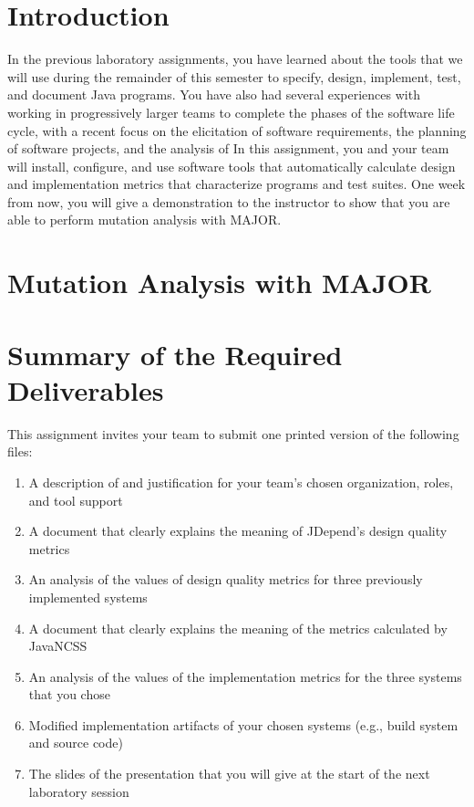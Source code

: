

\usepackage[compact]{titlesec}



\section*{Introduction}

In the previous laboratory assignments, you have learned about the tools that we will use during the remainder of this
semester to specify, design, implement, test, and document Java programs.  You have also had several experiences with
working in progressively larger teams to complete the phases of the software life cycle, with a recent focus on the
elicitation of software requirements, the planning of software projects, and the analysis of   In this assignment, you
and your team will install, configure, and use software tools that automatically calculate design and implementation
metrics that characterize programs and test suites. One week from now, you will give a demonstration to the instructor
to show that you are able to perform mutation analysis with MAJOR.

\section*{Mutation Analysis with MAJOR}

\section*{Summary of the Required Deliverables}

This assignment invites your team to submit one printed version of the following files:
\vspace*{-.1in}
\begin{enumerate}
	\itemsep0em 
	\item A description of and justification for your team's chosen organization, roles, and tool support
	\item A document that clearly explains the meaning of JDepend's design quality metrics 
	\item An analysis of the values of design quality metrics for three previously implemented systems 
	\item A document that clearly explains the meaning of the metrics calculated by JavaNCSS
	\item An analysis of the values of the implementation metrics for the three systems that you chose
	\item Modified implementation artifacts of your chosen systems (e.g., build system and source code) 
	\item The slides of the presentation that you will give at the start of the next laboratory session
\end{enumerate}
\vspace*{-.1in}

